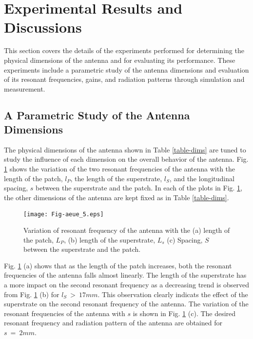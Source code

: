 \section{Experimental Results and Discussions}\label{c4sec:expt_results}
This section covers the details of the experiments performed for determining the physical dimensions of the antenna and for evaluating its performance. These experiments include a parametric study of the antenna dimensions and evaluation of its resonant frequencies, gains, and radiation patterns through simulation and measurement.

\subsection{A Parametric Study of the Antenna Dimensions}
The physical dimensions of the antenna shown in Table \ref{table-dims} are tuned to study the influence of each dimension on the overall behavior of the antenna. Fig. \ref{fig-vars} shows the variation of the two resonant frequencies of the antenna with the length of the patch, $l_P$, the length of the superstrate, $l_S$, and the longitudinal spacing, $s$ between the superstrate and the patch. In each of the plots in Fig. \ref{fig-vars}, the other dimensions of the antenna are kept fixed as in Table \ref{table-dims}.

\begin{figure}[h]
\centering
\texttt{[image: Fig-aeue\_5.eps]}
\caption{Variation of resonant frequency of the antenna with the (a) length of the patch, $L_P$, (b) length of the superstrate, $L_s$ (c) Spacing, $S$ between the superstrate and the patch.}\label{fig-vars}
\end{figure}

Fig. \ref{fig-vars} (a) shows that as the length of the patch increases, both the resonant frequencies of the antenna falls almost linearly. The length of the superstrate has a more impact on the second resonant frequency as a decreasing trend is observed from Fig. \ref{fig-vars} (b) for $l_S~>~17mm$. This observation clearly indicats the effect of the superstrate on the second resonant frequency of the antenna. The variation of the resonant frequencies of the antenna with $s$ is shown in Fig. \ref{fig-vars} (c). The desired resonant frequency and radiation pattern of the antenna are obtained for $s~=~2mm$.


